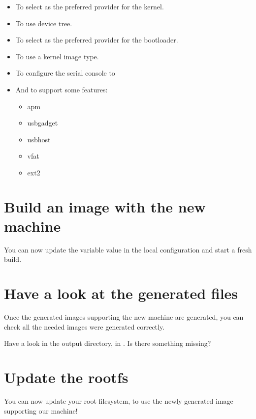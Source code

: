 \begin{itemize}
  \item To select  as the preferred provider
    for the kernel.
  \item To use  device tree.
  \item To select  as the preferred provider
    for the bootloader.
  \item To use a  kernel image type.
  \item To configure the serial console to 
  \item And to support some features:
    \begin{itemize}
      \item apm
      \item usbgadget
      \item usbhost
      \item vfat
      \item ext2
    \end{itemize}
\end{itemize}

\section{Build an image with the new machine}

You can now update the  variable value in the local configuration
and start a fresh build.

\section{Have a look at the generated files}

Once the generated images supporting the new  machine are
generated, you can check all the needed images were generated
correctly.

Have a look in the output directory, in
. Is there something
missing?

\section{Update the rootfs}

You can now update your root filesystem, to use the newly
generated image supporting our  machine!
